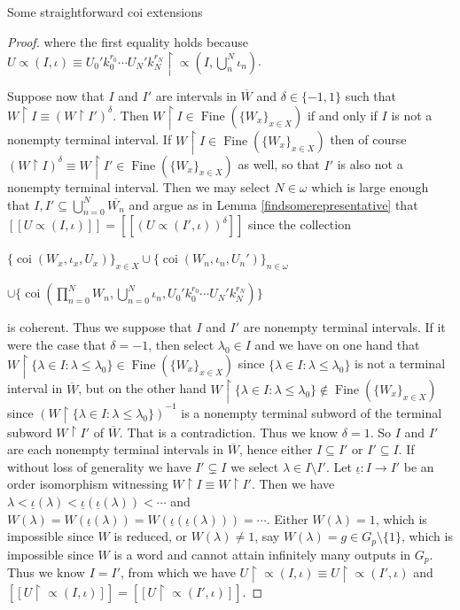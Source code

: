 \documentclass{amsart}
\theoremstyle{definition}\newtheorem{theorem}{Theorem}
\theoremstyle{definition}\newtheorem*{A}{Main Theorem}
\theoremstyle{definition}\newtheorem*{B}{Theorem \ref{elementaryequiv}}
\theoremstyle{definition}\newtheorem*{C}{Theorem \ref{continuous}}
\theoremstyle{definition}\newtheorem*{D}{Theorem \ref{bigisomorphism2}}
\theoremstyle{definition}\newtheorem{bigtheorem}{Main Theorem}
\numberwithin{theorem}{section}
\theoremstyle{definition}\newtheorem{corollary}[theorem]{Corollary}
\theoremstyle{definition}\newtheorem{proposition}[theorem]{Proposition}
\theoremstyle{definition}\newtheorem{definition}[theorem]{Definition}
\theoremstyle{definition}\newtheorem{question}[theorem]{Question}
\theoremstyle{definition}\newtheorem{example}[theorem]{Example}
\theoremstyle{definition}\newtheorem{remark}[theorem]{Remark}
\theoremstyle{definition}\newtheorem{note}[theorem]{Note}
\theoremstyle{definition}\newtheorem{lemma}[theorem]{Lemma}
\theoremstyle{definition}\newtheorem{fact}[theorem]{Fact}
\theoremstyle{definition}\newtheorem{define}[theorem]{Definition}
\theoremstyle{definition}\newtheorem{claim}[theorem]{Claim}
\theoremstyle{definition}\newtheorem{obs}[theorem]{Observation}
\theoremstyle{definition}\newtheorem{definitions}[theorem]{Definitions}
\newcommand{\Fine}{\operatorname{Fine}}
\newcommand{\coi}{\operatorname{coi}}
\begin{document}
\begin{section}{Some straightforward coi extensions}
\begin{proof}
\noindent where the first equality holds because $U \varpropto(I, \iota) \equiv U_0'k_0^{r_0}\cdots U_N'k_N^{r_N} \upharpoonright \varpropto(I, \bigcup_{n}^N \iota_n)$.

Suppose now that $I$ and $I'$ are intervals in $\overline{W}$ and $\delta \in \{-1, 1\}$ such that $W \upharpoonright I \equiv (W \upharpoonright I')^{\delta}$.  Then $W \upharpoonright I \in \Fine(\{W_x\}_{x \in X})$ if and only if $I$ is not a nonempty terminal interval.  If $W \upharpoonright I \in \Fine(\{W_x\}_{x \in X})$ then of course $(W \upharpoonright I)^{\delta} \equiv W \upharpoonright I' \in \Fine(\{W_x\}_{x \in X})$ as well, so that $I'$ is also not a nonempty terminal interval.  Then we may select $N \in \omega$ which is large enough that $I, I' \subseteq \bigcup_{n = 0}^N\overline{W_n}$ and argue as in Lemma \ref{findsomerepresentative} that $[[U\varpropto(I, \iota)]] = [[(U\varpropto(I', \iota))^{\delta}]]$ since the collection

\begin{center}
$\{\coi(W_x, \iota_x, U_x)\}_{x \in X} \cup \{\coi(W_n, \iota_n, U_n')\}_{n \in \omega}$

 $\cup \{\coi(\prod_{n = 0}^NW_n, \bigcup_{n = 0}^N \iota_n, U_0'k_0^{r_0}\cdots U_N'k_N^{r_N})\}$
\end{center}

\noindent is coherent.  Thus we suppose that $I$ and $I'$ are nonempty terminal intervals.  If it were the case that $\delta = -1$, then select $\lambda_0 \in I$ and we have on one hand that $W \upharpoonright \{\lambda \in I: \lambda \leq \lambda_0\} \in \Fine(\{W_x\}_{x \in X})$ since $\{\lambda \in I: \lambda \leq \lambda_0\}$ is not a terminal interval in $\overline{W}$, but on the other hand $W \upharpoonright \{\lambda \in I: \lambda \leq \lambda_0\} \notin \Fine(\{W_x\}_{x \in X})$ since $(W \upharpoonright \{\lambda \in I: \lambda \leq \lambda_0\})^{-1}$ is a nonempty terminal subword of the terminal subword $W \upharpoonright I'$ of $\overline{W}$.  That is a contradiction.  Thus we know $\delta = 1$.  So $I$ and $I'$ are each nonempty terminal intervals in $\overline{W}$, hence either $I \subseteq I'$ or $I'\subseteq I$.  If without loss of generality we have $I' \subsetneq I$ we select $\lambda \in I \setminus I'$.  Let $\underline{\iota}: I \rightarrow I'$ be an order isomorphism witnessing $W\upharpoonright I \equiv W \upharpoonright I'$.  Then we have $\lambda < \underline{\iota}(\lambda) < \underline{\iota}(\underline{\iota}(\lambda))<\cdots$ and $W(\lambda) = W(\underline{\iota}(\lambda)) = W(\underline{\iota}(\underline{\iota}(\lambda))) = \cdots$.  Either $W(\lambda) = 1$, which is impossible since $W$ is reduced, or $W(\lambda) \neq 1$, say $W(\lambda) = g \in G_p \setminus \{1\}$, which is impossible since $W$ is a word and cannot attain infinitely many outputs in $G_p$.  Thus we know $I = I'$, from which we have $U\upharpoonright \varpropto(I, \iota) \equiv U\upharpoonright \varpropto(I', \iota)$ and $[[U\upharpoonright \varpropto(I, \iota)]] = [[U\upharpoonright \varpropto(I', \iota)]]$.


\end{proof}
\end{section}
\end{document}
